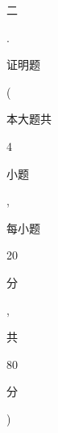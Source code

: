 \documentclass[10pt]{article}
\begin{document}
\begin{CJK}{UTF8}{mj}二\end{CJK}. \begin{CJK}{UTF8}{mj}证明题\end{CJK} (\begin{CJK}{UTF8}{mj}本大题共\end{CJK} 4 \begin{CJK}{UTF8}{mj}小题\end{CJK}, \begin{CJK}{UTF8}{mj}每小题\end{CJK} 20 \begin{CJK}{UTF8}{mj}分\end{CJK}, \begin{CJK}{UTF8}{mj}共\end{CJK} 80 \begin{CJK}{UTF8}{mj}分\end{CJK})
\end{document}
